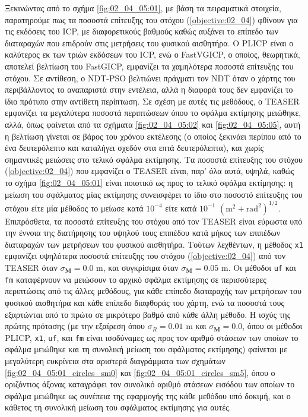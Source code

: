 Ξεκινώντας από το σχήμα \ref{fig:02_04_05:01}, με βάση τα πειραματικά στοιχεία,
παρατηρούμε πως τα ποσοστά επίτευξης του στόχου (\ref{objective:02_04}) φθίνουν
για τις εκδόσεις του ICP, με διαφορετικούς βαθμούς καθώς αυξάνει το επίπεδο των
διαταραχών που επιδρούν στις μετρήσεις του φυσικού αισθητήρα. Ο PLICP είναι ο
καλύτερος εκ των τριών εκδόσεων του ICP, ενώ ο FastVGICP, ο οποίος, θεωρητικά,
αποτελεί βελτίωση του FastGICP, εμφανίζει τα χαμηλότερα ποσοστά επίτευξης του
στόχου.  Σε αντίθεση, ο NDT-PSO βελτιώνει πράγματι τον NDT όταν ο χάρτης του
περιβάλλοντος το αναπαριστά στην εντέλεια, αλλά η διαφορά τους δεν εμφανίζει το
ίδιο πρότυπο στην αντίθετη περίπτωση. Σε σχέση με αυτές τις μεθόδους, ο TEASER
εμφανίζει τα μεγαλύτερα ποσοστά περιπτώσεων όπου το σφάλμα εκτίμησης μειώθηκε,
αλλά, όπως φαίνεται από τα σχήματα \ref{fig:02_04_05:02} και
\ref{fig:02_04_05:05}, αυτή η βελτίωση γίνεται σε βάρος του χρόνου εκτέλεσης (ο
οποίος ξεκινάει περίπου από το ένα δευτερόλεπτο και καταλήγει σχεδόν στα επτά
δευτερόλεπτα), και χωρίς σημαντικές μειώσεις στο τελικό σφάλμα εκτίμησης. Τα
ποσοστά επίτευξης του στόχου (\ref{objective:02_04}) που εμφανίζει ο TEASER
είναι, παρ' όλα αυτά, υψηλά, καθώς το σχήμα \ref{fig:02_04_05:01} είναι
ποιοτικό ως προς το τελικό σφάλμα εκτίμησης: η μείωση του σφάλματος μίας
εκτίμησης συνεισφέρει το ίδιο στο ποσοστό επίτευξης του στόχου είτε μία μέθοδος
το μείωσε κατά $10^{-4}$ είτε κατά $10^{-1}$ $(\text{m}^2 +
\text{rad}^2)^{1/2}$. Επιπρόσθετα, τα ποσοστά επίτευξης του στόχου από τον
TEASER είναι εύρωστα υπό την έννοια της διατήρησης του υψηλού τους επιπέδου
κατά μήκος των επιπέδων διαταραχών των μετρήσεων του φυσικού αισθητήρα. Τούτων
λεχθέντων, η μέθοδος \texttt{x1} εμφανίζει υψηλότερα ποσοστά επίτευξης του
στόχου (\ref{objective:02_04}) από τον TEASER όταν $\sigma_{\bm{M}} = 0.0$ m,
και συγκρίσιμα όταν $\sigma_{\bm{M}} = 0.05$ m. Οι μέθοδοι \texttt{uf} και
\texttt{fm} καταφέρνουν να μειώσουν το αρχικό σφάλμα εκτίμησης σε περισσότερες
περιπτώσεις από τις άλλες μεθόδους, για κάθε επίπεδο διαταραχής των μετρήσεων
του φυσικού αισθητήρα και κάθε επίπεδο διαφθοράς του χάρτη, ενώ τα ποσοστά τους
εξαρτώνται από το πρώτο σε μικρότερο βαθμό από κάθε άλλη μέθοδο. Η ισχύς της
πρώτης πρότασης (με την εξαίρεση όπου $\sigma_R = 0.01$ m και $\sigma_{\bm{M}}
= 0.0$, όπου οι μέθοδοι PLICP, \texttt{x1}, \texttt{uf}, και \texttt{fm} είναι
ισοδύναμες ως προς τον αριθμό στάσεων των οποίων το σφάλμα μειώθηκε και τη
συνολική μείωση του σφάλματος εκτίμησης) φαίνεται με μεγαλύτερη ευκρίνεια στα
αριστερά διαγράμματα των σχημάτων \ref{fig:02_04_05:01_circles_sm0} και
\ref{fig:02_04_05:01_circles_sm5}, όπου ο οριζόντιος άξονας καταγράφει τον
συνολικό αριθμό στάσεων εισόδου των οποίων το σφάλμα μειώθηκε ως συνέπεια της
εφαρμογής της κάθε μεθόδου υπό δοκιμή, και ο κάθετος τη συνολική μείωση του
σφάλματος εκτίμησης για αυτές.

